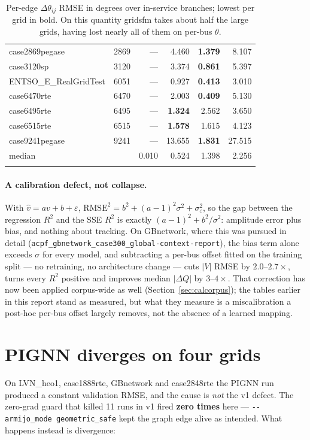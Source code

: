 \documentclass[10pt]{article}
\begin{document}
\begin{longtable}{lrrrrr}
case2869pegase & 2869 & --- & 4.460 & \textbf{1.379} & 8.107 \\
case3120sp & 3120 & --- & 3.374 & \textbf{0.861} & 5.397 \\
ENTSO\_E\_RealGridTest & 6051 & --- & 0.927 & \textbf{0.413} & 3.010 \\
case6470rte & 6470 & --- & 2.003 & \textbf{0.409} & 5.130 \\
case6495rte & 6495 & --- & \textbf{1.324} & 2.562 & 3.650 \\
case6515rte & 6515 & --- & \textbf{1.578} & 1.615 & 4.123 \\
case9241pegase & 9241 & --- & 13.655 & \textbf{1.831} & 27.515 \\
\midrule
median & & 0.010 & 0.524 & 1.398 & 2.256 \\
\bottomrule
\caption{Per-edge $\Delta\theta_{ij}$ RMSE in degrees over in-service branches;
lowest per grid in bold.  On this quantity gridsfm takes about half the large
grids, having lost nearly all of them on per-bus $\theta$.}
\end{longtable}

\paragraph{A calibration defect, not collapse.}  With
$\hat v = a v + b + \varepsilon$,
$\mathrm{RMSE}^2 = b^2 + (a-1)^2\sigma^2 + \sigma_\varepsilon^2$, so the gap
between the regression $R^2$ and the SSE $R^2$ is exactly
$(a-1)^2 + b^2/\sigma^2$: amplitude error plus bias, and nothing about
tracking.  On GBnetwork, where this was pursued in detail
(\texttt{acpf\_gbnetwork\_case300\_global-context-report}), the bias term alone
exceeds $\sigma$ for every model, and subtracting a per-bus offset fitted on
the training split --- no retraining, no architecture change --- cuts $|V|$
RMSE by $2.0$--$2.7\times$, turns every $R^2$ positive and improves median
$|\Delta Q|$ by $3$--$4\times$.  That correction has now been applied
corpus-wide as well (Section~\ref{sec:calcorpus}); the tables earlier in this
report stand as measured, but what they measure is a miscalibration a post-hoc
per-bus offset largely removes, not the absence of a learned mapping.

\section{PIGNN diverges on four grids}

On LVN\_heo1, case1888rte, GBnetwork and case2848rte the PIGNN run produced a
constant validation RMSE, and the cause is \emph{not} the v1 defect. The
zero-grad guard that killed 11 runs in v1 fired \textbf{zero times} here ---
\texttt{-{}-armijo\_mode geometric\_safe} kept the graph edge alive as intended.
What happens instead is divergence:
\end{document}
